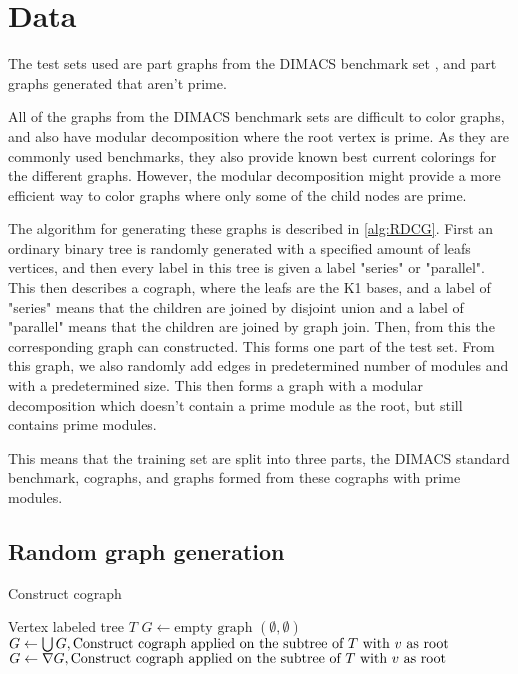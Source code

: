 \documentclass{amsart}
\begin{document}

\section{Data}
\label{sec:Data}

The test sets used are part graphs from the DIMACS benchmark set \cite{DIMACS}, 
and part graphs generated that aren't prime.

All of the graphs from the DIMACS benchmark sets are difficult to color graphs,
and also have modular decomposition where the root vertex is prime. As they are
commonly used benchmarks, they also provide known best current colorings for the
different graphs. However, the modular decomposition might provide a more
efficient way to color graphs where only some of the child nodes are prime. 

The algorithm for generating these graphs is described in \autoref{alg:RDCG}. First an
ordinary binary tree is randomly generated with a specified amount of leafs
vertices, and then every label in this tree is given a label "series" or
"parallel".  This then describes a cograph, where the leafs are the K1 bases,
and a label of "series" means that the children are joined by disjoint union and a label
of "parallel" means that the children are joined by graph join. Then, from this
the corresponding graph can constructed. This forms one part of the test set.
From this graph, we also randomly add edges in predetermined number of modules
and with a predetermined size. This then forms a graph with a modular
decomposition which doesn't contain a prime module as the root, but still
contains prime modules.

This means that the training set are split into three parts, the DIMACS standard
benchmark, cographs, and graphs formed from these cographs with prime modules.


\subsection{Random graph generation}

\begin{algorithm}[H]
    \caption{Construct cograph}
    \begin{algorithmic}[1]
        \REQUIRE Vertex labeled tree $T$
        \ENDIF
        \STATE $G \leftarrow \text{empty graph $(\emptyset,\emptyset)$}$
                \STATE $G \leftarrow \bigcup G, \text{\text{Construct cograph} applied
                on the subtree of $T$ with $v$ as root} $
                \STATE $G \leftarrow \nabla G, \text{\text{Construct cograph} applied
                on the subtree of $T$ with $v$ as root}$
            \ENDIF
        \ENDFOR
    \end{algorithmic}
\end{algorithm}
\end{document}
